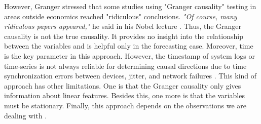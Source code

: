 However, Granger stressed that some studies using "Granger causality" testing in areas outside economics reached "ridiculous" conclusions. \textit{"Of course, many ridiculous papers appeared,"} he said in his Nobel lecture \cite{granger2004nobel}. Thus, the Granger causality is not the true causality. It provides no insight into the relationship between the variables and is helpful only in the forecasting case. Moreover, time is the key parameter in this approach. However, the timestamp of system logs or time-series is not always reliable for determining causal directions due to time synchronization errors between devices, jitter, and network failures \cite{kobayashi2017mining}. This kind of approach has other limitations. One is that the Granger causality only gives information about linear features. Besides this, one more is that the variables must be stationary. Finally, this approach depends on the observations we are dealing with \cite{seth2007granger}.
